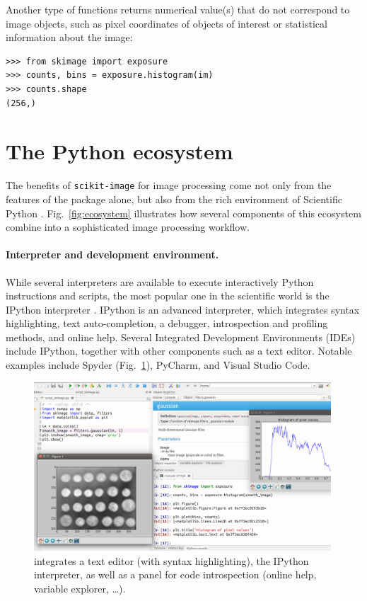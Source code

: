 \documentclass[twocolumn]{bmcart}%
\begin{document}
Another type of functions returns numerical value(s) that do not
correspond to image objects, such as pixel coordinates of objects of
interest or statistical
information about the image:
\begin{lstlisting}
>>> from skimage import exposure
>>> counts, bins = exposure.histogram(im)
>>> counts.shape
(256,)
\end{lstlisting}

\section*{The Python ecosystem}

The benefits of \texttt{scikit-image} for image processing come not only
from the features of the package alone, but also from the rich
environment of Scientific Python \citep{Oliphant2007, Perez2011}.
Fig.~\ref{fig:ecosystem} illustrates how several components of this
ecosystem combine into a sophisticated image processing workflow.

\paragraph{Interpreter and development environment.}

While several interpreters are available to execute interactively Python
instructions and scripts, the most popular one in the scientific world is
the IPython interpreter \citep{Perez2007, Rossant2015}. IPython is an
advanced interpreter, which integrates syntax highlighting, text auto-completion,
a debugger,
introspection and profiling methods, and online help. Several
Integrated Development Environments (IDEs) include IPython,
together with other components such as a text editor. Notable examples
include Spyder (Fig.~\ref{fig:spyder}), PyCharm, and Visual Studio Code.

\begin{figure}
    \centerline{\includegraphics[width=0.99\textwidth]{spyder_process}}
    \caption{ integrates a text editor (with
	syntax highlighting), the IPython interpreter, as well as a panel
	for code introspection (online help, variable explorer, \dots).
 \label{fig:spyder}}
\end{figure}
\end{document}
